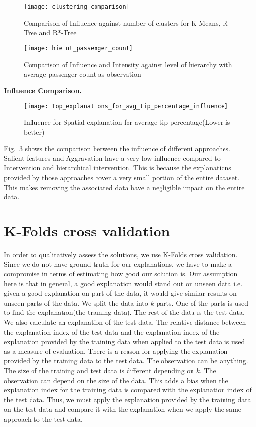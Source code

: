 \begin{figure}[H]
\texttt{[image: clustering\_comparison]}
\caption{Comparison of Influence against number of clusters for K-Means, R-Tree and R*-Tree}
\label{fig:clustering_comparison}
\end{figure}

\begin{figure}[h]
\texttt{[image: hieint\_passenger\_count]}
\caption{Comparison of Influence and Intensity against level of hierarchy with average passenger count as observation}
\label{fig:hieint_passenger_count}
\end{figure}
\textbf{Influence Comparison.}
\begin{figure}[h]
\texttt{[image: Top\_explanations\_for\_avg\_tip\_percentage\_influence]}
\caption{Influence for Spatial explanation for average tip percentage(Lower is better)}
\label{fig:influence_comparison}
\end{figure}

Fig.~\ref{fig:influence_comparison} shows the comparison between the influence of different approaches. Salient features and Aggravation have a very low influence compared to Intervention and hierarchical intervention. This is because the explanations provided by those approaches cover a very small portion of the entire dataset. This makes removing the associated data have a negligible impact on the entire data.

\section{K-Folds cross validation}
In order to qualitatively assess the solutions, we use K-Folds cross validation\citep{refaeilzadeh2009cross}. Since we do not have ground truth for our explanations, we have to make a compromise in terms of estimating how good our solution is. Our assumption here is that in general, a good explanation would stand out on unseen data i.e. given a good explanation on part of the data, it would give similar results on unseen parts of the data. We split the data into $k$ parts. One of the parts is used to find the explanation(the training data). The rest of the data is the test data. We also calculate an explanation of the test data. The relative distance between the explanation index of the test data and the explanation index of the explanation provided by the training data when applied to the test data is used as a measure of evaluation.
There is a reason for applying the explanation provided by the training data to the test data. The observation can be anything. The size of the training and test data is different depending on $k$. The observation can depend on the size of the data. This adds a bias when the explanation index for the training data is compared with the explanation index of the test data. Thus, we must apply the explanation provided by the training data on the test data and compare it with the explanation when we apply the same approach to the test data.

